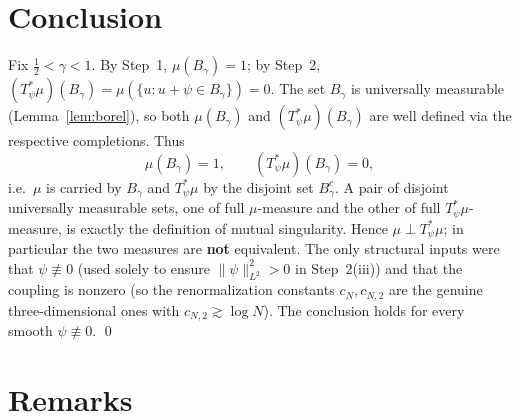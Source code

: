 \section*{Conclusion}

Fix $\tfrac12<\gamma<1$. By Step~1, $\mu(B_\gamma)=1$; by Step~2,
$(T_\psi^*\mu)(B_\gamma)=\mu(\{u:u+\psi\in B_\gamma\})=0$. The set $B_\gamma$ is
universally measurable (Lemma~\ref{lem:borel}), so both $\mu(B_\gamma)$ and
$(T_\psi^*\mu)(B_\gamma)$ are well defined via the respective completions. Thus
\[
\mu(B_\gamma)=1,\qquad (T_\psi^*\mu)(B_\gamma)=0 ,
\]
i.e.\ $\mu$ is carried by $B_\gamma$ and $T_\psi^*\mu$ by the disjoint set
$B_\gamma^c$. A pair of disjoint universally measurable sets, one of full
$\mu$-measure and the other of full $T_\psi^*\mu$-measure, is exactly the
definition of mutual singularity. Hence $\mu\perp T_\psi^*\mu$; in particular the
two measures are \textbf{not} equivalent. The only structural inputs were that
$\psi\not\equiv0$ (used solely to ensure $\|\psi\|_{L^2}^2>0$ in Step~2(iii)) and
that the coupling is nonzero (so the renormalization constants $c_N,c_{N,2}$ are
the genuine three-dimensional ones with $c_{N,2}\gtrsim\log N$). The conclusion
holds for every smooth $\psi\not\equiv0$. \qed

\section*{Remarks}

